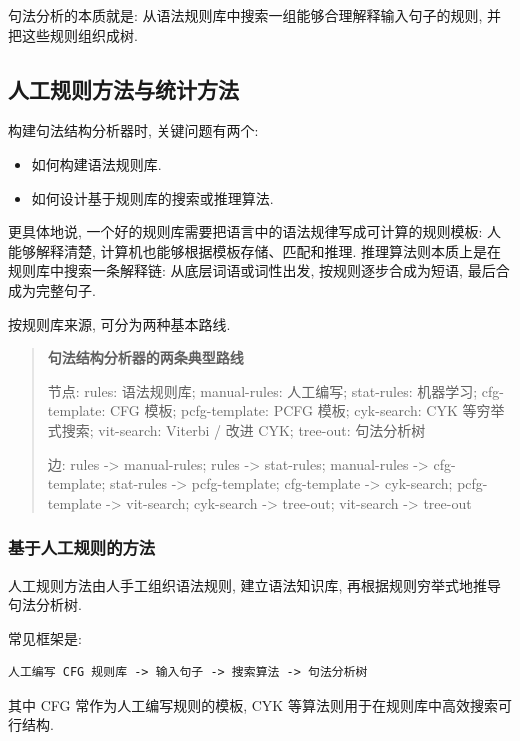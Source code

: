 句法分析的本质就是:
从语法规则库中搜索一组能够合理解释输入句子的规则, 并把这些规则组织成树.

\subsection{人工规则方法与统计方法}


构建句法结构分析器时, 关键问题有两个:

\begin{itemize}
\item 如何构建语法规则库.
\item 如何设计基于规则库的搜索或推理算法.
\end{itemize}

更具体地说, 一个好的规则库需要把语言中的语法规律写成可计算的规则模板:
人能够解释清楚, 计算机也能够根据模板存储、匹配和推理.
推理算法则本质上是在规则库中搜索一条解释链:
从底层词语或词性出发, 按规则逐步合成为短语, 最后合成为完整句子.

按规则库来源, 可分为两种基本路线.

\begin{quote}
\small
\textbf{句法结构分析器的两条典型路线}
\par 节点: rules: 语法规则库; manual-rules: 人工编写; stat-rules: 机器学习; cfg-template: CFG 模板; pcfg-template: PCFG 模板; cyk-search: CYK 等穷举式搜索; vit-search: Viterbi / 改进 CYK; tree-out: 句法分析树
\par 边: rules -\textgreater{} manual-rules; rules -\textgreater{} stat-rules; manual-rules -\textgreater{} cfg-template; stat-rules -\textgreater{} pcfg-template; cfg-template -\textgreater{} cyk-search; pcfg-template -\textgreater{} vit-search; cyk-search -\textgreater{} tree-out; vit-search -\textgreater{} tree-out
\end{quote}

\subsubsection{基于人工规则的方法}


人工规则方法由人手工组织语法规则, 建立语法知识库, 再根据规则穷举式地推导句法分析树.

常见框架是:

\begin{Verbatim}[breaklines=true,breakanywhere=true,fontsize=\small]
人工编写 CFG 规则库 -> 输入句子 -> 搜索算法 -> 句法分析树
\end{Verbatim}

其中 CFG 常作为人工编写规则的模板, CYK 等算法则用于在规则库中高效搜索可行结构.


